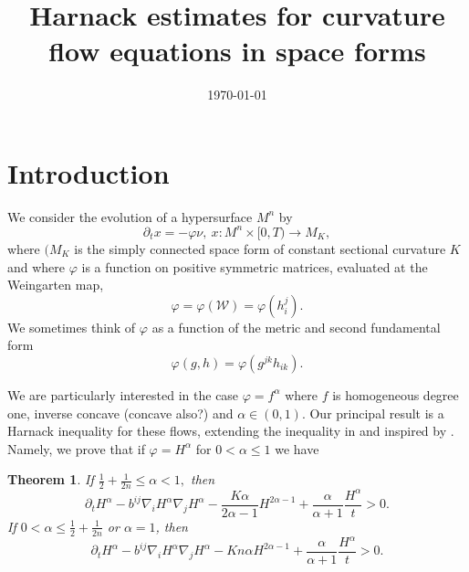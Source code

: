 \documentclass{amsart}
\newtheorem{theorem}{Theorem}
\theoremstyle{definition}
\theoremstyle{remark}
\numberwithin{equation}{section}
\begin{document}
\title[]
 {Harnack estimates for curvature flow equations in space forms}

\curraddr{}
\email{}
\date{\today}

\dedicatory{}
\subjclass[2010]{}
\keywords{}

\begin{abstract}
\end{abstract}

\maketitle

\section{Introduction}

We consider the evolution of a hypersurface $M^n$ by
\[
\partial_tx=-\varphi\nu,~ x:M^n\times[0,T)\to M_K,
\]
where \((M_K\) is the simply connected space form of constant sectional curvature \(K\) and where $\varphi$ is a function on positive symmetric matrices, evaluated at the Weingarten map,
\[
\varphi = \varphi(\mathcal{W}) = \varphi(h^j_i).
\]
We sometimes think of \(\varphi\) as a function of the metric and second fundamental form
\[
\varphi(g, h) = \varphi(g^{jk} h_{ik}).
\]

We are particularly interested in the case \(\varphi = f^{\alpha}\) where \(f\) is homogeneous degree one, inverse concave (concave also?) and \(\alpha \in (0,1)\). Our principal result is a Harnack inequality for these flows, extending the inequality in \cite{2015arXiv150802821B, bryanlouie} and inspired by \cite{MR1316556, MR1100812, MR1296393, MR1480081}. Namely, we prove that if \(\varphi = H^{\alpha}\) for \(0 < \alpha \leq 1\) we have

\begin{theorem}
If $\frac{1}{2}+\frac{1}{2n}\leq {\alpha}< 1,$ then
\[
\partial_tH^{\alpha} - b^{ij}\nabla_iH^{\alpha}\nabla_jH^{\alpha} - \frac{K {\alpha}}{2{\alpha}-1}H^{2{\alpha}-1} + \frac{{\alpha}}{{\alpha}+1} \frac{H^{\alpha}}{t} > 0.
\]
If $0<{\alpha}\leq \frac{1}{2} + \frac{1}{2n}$ or ${\alpha}=1$, then
\[
\partial_tH^{\alpha} - b^{ij}\nabla_iH^{\alpha}\nabla_jH^{\alpha} - K n{\alpha}H^{2{\alpha}-1} + \frac{{\alpha}}{{\alpha}+1} \frac{H^{\alpha}}{t} > 0.
\]
\end{theorem}
\end{document}
